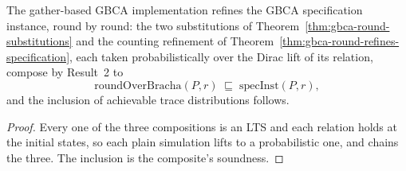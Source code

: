 \begin{theorem}
  \label{thm:gbca-gather-refines}
  \leanok
  The gather-based GBCA implementation refines the GBCA specification instance, round by round: the two substitutions of Theorem~\ref{thm:gbca-round-substitutions} and the counting refinement of Theorem~\ref{thm:gbca-round-refines-specification}, each taken probabilistically over the Dirac lift of its relation, compose by Result~2 to
  \[
    \mathrm{roundOverBracha}(P, r) \;\sqsubseteq\; \mathrm{specInst}(P, r),
  \]
  and the inclusion of achievable trace distributions follows.
\end{theorem}

\begin{proof}\leanok
  Every one of the three compositions is an LTS and each relation holds at the initial states, so each plain simulation lifts to a probabilistic one, and  chains the three.
  The inclusion is the composite's soundness.
\end{proof}
